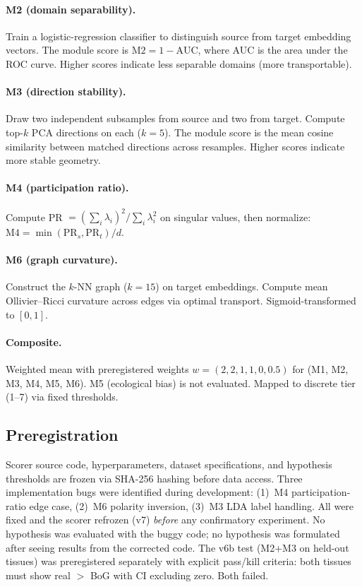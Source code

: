 \documentclass[9pt,lineno]{elife}
\begin{document}
\paragraph{M2 (domain separability).} Train a logistic-regression classifier to distinguish source from target embedding vectors. The module score is $\text{M2} = 1 - \text{AUC}$, where AUC is the area under the ROC curve. Higher scores indicate less separable domains (more transportable).

\paragraph{M3 (direction stability).} Draw two independent subsamples from source and two from target. Compute top-$k$ PCA directions on each ($k = 5$). The module score is the mean cosine similarity between matched directions across resamples. Higher scores indicate more stable geometry.

\paragraph{M4 (participation ratio).} Compute PR $= (\sum_i \lambda_i)^2 / \sum_i \lambda_i^2$ on singular values, then normalize: $\text{M4} = \min(\text{PR}_s, \text{PR}_t) / d$.

\paragraph{M6 (graph curvature).} Construct the $k$-NN graph ($k = 15$) on target embeddings. Compute mean Ollivier--Ricci curvature across edges via optimal transport. Sigmoid-transformed to $[0, 1]$.

\paragraph{Composite.} Weighted mean with preregistered weights $w = (2, 2, 1, 1, 0, 0.5)$ for (M1, M2, M3, M4, M5, M6). M5 (ecological bias) is not evaluated. Mapped to discrete tier (1--7) via fixed thresholds.

\subsection{Preregistration}

Scorer source code, hyperparameters, dataset specifications, and hypothesis thresholds are frozen via SHA-256 hashing before data access. Three implementation bugs were identified during development: (1)~M4 participation-ratio edge case, (2)~M6 polarity inversion, (3)~M3 LDA label handling. All were fixed and the scorer refrozen (v7) \emph{before} any confirmatory experiment. No hypothesis was evaluated with the buggy code; no hypothesis was formulated after seeing results from the corrected code. The v6b test (M2+M3 on held-out tissues) was preregistered separately with explicit pass/kill criteria: both tissues must show real $>$ BoG with CI excluding zero. Both failed.
\end{document}
